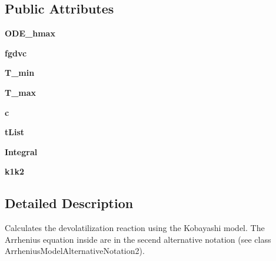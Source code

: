 \subsection*{\-Public \-Attributes}
\begin{DoxyCompactItemize}
\item 
\hypertarget{classFit__one__run_1_1KobayashiA2_a53cc341f54c05805cfac341a24d2c8eb}{{\bfseries \-O\-D\-E\-\_\-hmax}}\label{classFit__one__run_1_1KobayashiA2_a53cc341f54c05805cfac341a24d2c8eb}

\item 
\hypertarget{classFit__one__run_1_1KobayashiA2_a142eae60c24a79dbee613991a0c56efc}{{\bfseries fgdvc}}\label{classFit__one__run_1_1KobayashiA2_a142eae60c24a79dbee613991a0c56efc}

\item 
\hypertarget{classFit__one__run_1_1KobayashiA2_afe7ae4b76086dd1409b88526b04aa367}{{\bfseries \-T\-\_\-min}}\label{classFit__one__run_1_1KobayashiA2_afe7ae4b76086dd1409b88526b04aa367}

\item 
\hypertarget{classFit__one__run_1_1KobayashiA2_a6eaea10c437206c1fed8f2f829adb70e}{{\bfseries \-T\-\_\-max}}\label{classFit__one__run_1_1KobayashiA2_a6eaea10c437206c1fed8f2f829adb70e}

\item 
\hypertarget{classFit__one__run_1_1KobayashiA2_a4d4c2c1c880bb8a4571c7adfc0239b31}{{\bfseries c}}\label{classFit__one__run_1_1KobayashiA2_a4d4c2c1c880bb8a4571c7adfc0239b31}

\item 
\hypertarget{classFit__one__run_1_1KobayashiA2_aa493d70308dcdb576fcb256126dcf417}{{\bfseries t\-List}}\label{classFit__one__run_1_1KobayashiA2_aa493d70308dcdb576fcb256126dcf417}

\item 
\hypertarget{classFit__one__run_1_1KobayashiA2_a4354761599b2e2dc75d3c51729a3a06e}{{\bfseries \-Integral}}\label{classFit__one__run_1_1KobayashiA2_a4354761599b2e2dc75d3c51729a3a06e}

\item 
\hypertarget{classFit__one__run_1_1KobayashiA2_a5469033f40f3eea1b25116a40c2978c5}{{\bfseries k1k2}}\label{classFit__one__run_1_1KobayashiA2_a5469033f40f3eea1b25116a40c2978c5}

\end{DoxyCompactItemize}


\subsection{\-Detailed \-Description}
\begin{DoxyVerb}Calculates the devolatilization reaction using the Kobayashi model. The Arrhenius equation inside are in the secend alternative notation (see class ArrheniusModelAlternativeNotation2).\end{DoxyVerb}
 

